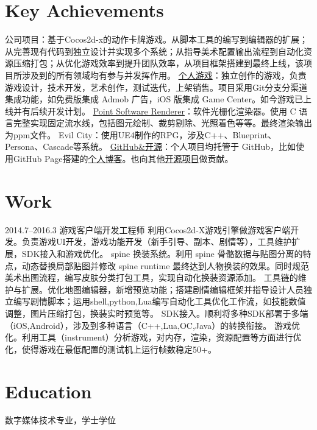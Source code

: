 \documentclass[full]{rvca}
\begin{document}
\section{Key Achievements}

\achievements
{公司项目：基于Cocos2d-x的动作卡牌游戏。从脚本工具的编写到编辑器的扩展；从完善现有代码到独立设计并实现多个系统；从指导美术配置输出流程到自动化资源压缩打包；从优化游戏效率到提升团队效率，从项目框架搭建到最终上线，该项目所涉及到的所有领域均有参与并发挥作用。}
{\href{http://a.app.qq.com/o/simple.jsp?pkgname=com.kode.Thirteen}{个人游戏}：独立创作的游戏，负责游戏设计，技术开发，艺术创作，测试迭代，上架销售。项目采用Git分支分渠道集成功能，如免费版集成 Admob 广告，iOS 版集成 Game Center。如今游戏已上线并有后续开发计划。}
{\href{https://github.com/keyring/point}{Point Software Renderer}：软件光栅化渲染器。使用 C 语言完整实现固定流水线，包括图元绘制、裁剪剔除、光照着色等等。最终渲染输出为ppm文件。}
{Evil City：使用UE4制作的RPG，涉及C++、Blueprint、Persona、Cascade等系统。}
{\href{http://github.com/keyring}{GitHub\&开源}：个人项目均托管于 GitHub，比如使用GitHub Page搭建的\href{http://www.photoneray.com}{个人博客}。也向其他\href{https://github.com/cloudwu/lua53doc/graphs/contributors}{开源项目}做贡献。}
{}

\section{Work}


{2014.7--2016.3}%
{游戏客户端开发工程师} %
{利用Cocos2d-X游戏引擎做游戏客户端开发。负责游戏UI开发，游戏功能开发（新手引导、副本、剧情等），工具维护扩展，SDK接入和游戏优化。}%
{spine 换装系统。利用 spine 骨骼数据与贴图分离的特点，动态替换局部贴图并修改 spine runtime 最终达到人物换装的效果。同时规范美术出图流程，编写皮肤分类打包工具，实现自动化换装资源添加。}
{工具链的维护与扩展。优化地图编辑器，新增预览功能；搭建剧情编辑框架并指导设计人员独立编写剧情脚本；运用shell,python,Lua编写自动化工具优化工作流，如技能数值调整，图片压缩打包，换装实时预览等。}
{SDK接入。顺利将多种SDK部署于多端（iOS,Android），涉及到多种语言（C++,Lua,OC,Java）的转换衔接。}
{游戏优化。利用工具（instrument）分析游戏，对内存，渲染，资源配置等方面进行优化，使得游戏在最低配置的测试机上运行帧数稳定50+。}
{}

\section{Education}

数字媒体技术专业，学士学位
\end{document}
